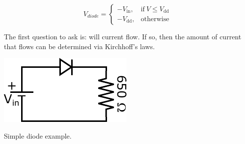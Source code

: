 \documentclass{tufte-book}
\begin{document}
\begin{equation}
\label{eq:effective_diode_source}
    V_{diode}=
    \begin{cases}
      -V_\text{in}, & \text{if}\ V\le V_\text{dd} \\
      -V_\text{dd}, & \text{otherwise}
    \end{cases}
  \end{equation}

The first question to ask is: will current flow. If so, then the amount of current that flows can be determined via Kirchhoff's laws.

\begin{marginfigure}
  \includegraphics[]{simple_diode_ex}
  \caption{Simple diode example.}
  \label{fig:simple_diode_ex}
\end{marginfigure}
\end{document}
